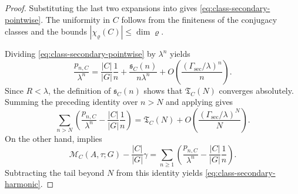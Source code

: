 \begin{proof}
  Substituting the last two expansions into
   gives
  \eqref{eq:class-secondary-pointwise}. The uniformity in \(C\) follows
  from the finiteness of the conjugacy classes and the bounds
  \(|\chi_\varrho(C)|\le \dim\varrho\).

  Dividing \eqref{eq:class-secondary-pointwise} by \(\lambda^n\) yields
  \[
    \frac{p_{n,C}}{\lambda^n}
    =
    \frac{|C|}{|G|}\frac{1}{n}
    +\frac{\mathfrak s_C(n)}{n\lambda^n}
    +O\!\left(\frac{(\Gamma_{\mathrm{sec}}/\lambda)^n}{n}\right).
  \]
  Since \(R<\lambda\), the definition of \(\mathfrak s_C(n)\) shows
  that \(\mathfrak T_C(N)\) converges absolutely. Summing the preceding
  identity over \(n>N\) and applying
   gives
  \[
    \sum_{n>N}
      \left(
        \frac{p_{n,C}}{\lambda^n}
        -\frac{|C|}{|G|}\frac{1}{n}
      \right)
    =
    \mathfrak T_C(N)
    +O\!\left(\frac{(\Gamma_{\mathrm{sec}}/\lambda)^N}{N}\right).
  \]
  On the other hand,  implies
  \[
    \mathcal M_C(A,\tau;G)-\frac{|C|}{|G|}\gamma
    =
    \sum_{n\ge 1}
      \left(
        \frac{p_{n,C}}{\lambda^n}
        -\frac{|C|}{|G|}\frac{1}{n}
      \right).
  \]
  Subtracting the tail beyond \(N\) from this identity yields
  \eqref{eq:class-secondary-harmonic}.
\end{proof}

